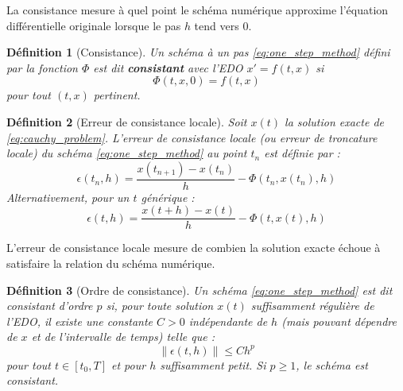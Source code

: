 \documentclass{article}
\newtheorem{definition}{Définition}
\begin{document}
La consistance mesure à quel point le schéma numérique approxime l'équation différentielle originale lorsque le pas $h$ tend vers 0.

\begin{definition}[Consistance]
Un schéma à un pas \eqref{eq:one_step_method} défini par la fonction $\Phi$ est dit \textbf{consistant} avec l'EDO $x' = f(t, x)$ si
\begin{equation*}
\Phi(t, x, 0) = f(t, x)
\end{equation*}
pour tout $(t, x)$ pertinent.
\end{definition}

\begin{definition}[Erreur de consistance locale]
Soit $x(t)$ la solution exacte de \eqref{eq:cauchy_problem}. L'erreur de consistance locale (ou erreur de troncature locale) du schéma \eqref{eq:one_step_method} au point $t_n$ est définie par :
\begin{equation*}
\epsilon(t_n, h) = \frac{x(t_{n+1}) - x(t_n)}{h} - \Phi(t_n, x(t_n), h)
\end{equation*}
Alternativement, pour un $t$ générique :
\begin{equation*}
\epsilon(t, h) = \frac{x(t+h) - x(t)}{h} - \Phi(t, x(t), h)
\end{equation*}
\end{definition}
L'erreur de consistance locale mesure de combien la solution exacte échoue à satisfaire la relation du schéma numérique.

\begin{definition}[Ordre de consistance]
Un schéma \eqref{eq:one_step_method} est dit consistant d'ordre $p$ si, pour toute solution $x(t)$ suffisamment régulière de l'EDO, il existe une constante $C > 0$ indépendante de $h$ (mais pouvant dépendre de $x$ et de l'intervalle de temps) telle que :
\begin{equation*}
 \|\epsilon(t, h)\| \le C h^p
\end{equation*}
pour tout $t \in [t_0, T]$ et pour $h$ suffisamment petit.
Si $p \ge 1$, le schéma est consistant.
\end{definition}
\end{document}
